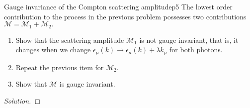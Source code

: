 \begin{problem}{Gauge invariance of the Compton scattering amplitude}{p5}
   The lowest order contribution to the process in the previous problem possesses two contributions \(\mathcal{M} = \mathcal{M}_1 + \mathcal{M}_2.\) 
   \begin{enumerate}[label=(\alph*)]
      \item Show that the scattering amplitude \(\mathcal{M}_1\) is not gauge invariant, that is, it changes when we change \(\epsilon_\mu(k) \to \epsilon_\mu(k) + \lambda k_\mu\) for both photons.
      \item Repeat the previous item for \(\mathcal{M}_2.\)
      \item Show that \(\mathcal{M}\) is gauge invariant.
   \end{enumerate}
\end{problem}
\begin{proof}[Solution]
    
\end{proof}
